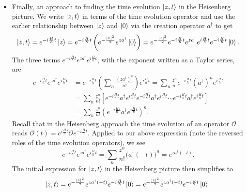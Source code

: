 \documentclass[11pt, a4paper]{article}
\newcommand{\tev}{e^{-i\frac{H}{\hbar}t}}  %
\newcommand{\tevp}{e^{i\frac{H}{\hbar}t}}  %
\begin{document}
\begin{itemize}
	\item Finally, an approach to finding the time evolution $ \ket{z, t} $ in the Heisenberg picture. We write $ \ket{z, t} $ in terms of the time evolution operator and use the earlier relationship between $ \ket{z} $ and $ \ket{0} $ via the creation operator $ a^{\dagger} $ to get
	\begin{equation*}
		\ket{z, t} = \tev \ket{z} = \tev\left( e^{-\frac{\abs{z}^{2}}{2}}e^{za^{\dagger}}\ket{0}\right) = e^{-\frac{\abs{z}^{2}}{2}}\tev e^{za^{\dagger}}\tevp \tev \ket{0}.
	\end{equation*}
	The three terms $ \tev e^{za^{\dagger}} \tevp $, with the exponent written as a Taylor series, are
	\begin{align*}
		\tev e^{za^{\dagger}} \tevp &= \tev \left(\sum_{n}\frac{(za^{\dagger})^{n}}{n!}\right)\tevp = \sum_{n} \frac{z^{n}}{n!}\tev (a^{\dagger})^{n} \tevp\\
		&= \sum_{n}\frac{z^{n}}{n!}\left[\tev a^{\dagger}\tevp \tev a^{\dagger}\tevp \cdots \tev a^{\dagger}\tevp\right]\\
		&=\sum_{n}\frac{z^{n}}{n!}\left(\tev a^{\dagger}\tevp\right)^{n}.
	\end{align*}
	Recall that in the Heisenberg approach the time evolution of an operator $ \mathcal{O} $ reads $  \mathcal{O}(t) = \tevp  \mathcal{O} \tev$. Applied to our above expression (note the reversed roles of the time evolution operators), we see
	\begin{equation*}
		\tev e^{za^{\dagger}} \tevp = \sum_{n}\frac{z^{n}}{n!}\big(a^{\dagger}(-t)\big)^{n} = e^{za^{\dagger}(-t)}.
	\end{equation*}
	The initial expression for $ \ket{z, t} $ in the Heisenberg picture then simplifies to
	\begin{equation*}
		\ket{z, t} = e^{-\frac{\abs{z}^{2}}{2}}  e^{za^{\dagger}(-t)} \tev \ket{0} = e^{-\frac{\abs{z}^{2}}{2}}  e^{za^{\dagger}(-t)} e^{-i\frac{\omega}{2}t}\ket{0}.
	\end{equation*}
	

\end{itemize}
\end{document}
